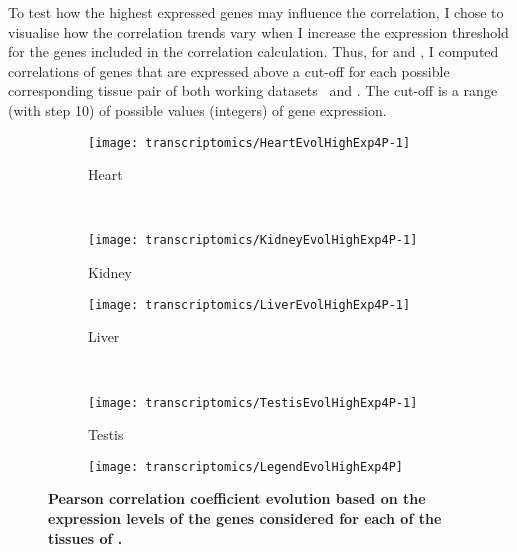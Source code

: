 To test how the highest expressed genes may influence the correlation,
I chose to visualise how the correlation trends vary
when I increase the expression threshold for the genes included
in the correlation calculation.
Thus, for  and ,
I computed correlations of genes that are expressed above a cut-off
for each possible corresponding tissue pair of both working datasets \setOne\ and \setTwo.
The cut-off is a range (with step 10) of possible values (integers) of gene expression.

\begin{sidewaysfigure}[!htpb]
    \centering
    \begin{subfigure}[b]{0.48\textwidth}\centering
        \texttt{[image: transcriptomics/HeartEvolHighExp4P-1]}
        \caption{Heart}\label{fig:CorHighExpHeart4T}
    \end{subfigure}%
~%
    \begin{subfigure}[b]{0.48\textwidth}\centering
        \texttt{[image: transcriptomics/KidneyEvolHighExp4P-1]}
        \caption{Kidney}\label{fig:CorHighExpKidney4T}
    \end{subfigure}

    \begin{subfigure}[b]{0.48\textwidth}\centering
        \texttt{[image: transcriptomics/LiverEvolHighExp4P-1]}
        \caption{Liver}\label{fig:CorHighExpLiver4T}
    \end{subfigure}%
~%
    \begin{subfigure}[b]{0.48\textwidth}\centering
        \texttt{[image: transcriptomics/TestisEvolHighExp4P-1]}
        \caption{Testis}\label{fig:CorHighExpTestis4T}
    \end{subfigure}
    \begin{subfigure}[b]{\textwidth}\centering
        \texttt{[image: transcriptomics/LegendEvolHighExp4P]}
    \end{subfigure}
    \caption[Pearson correlation coefficient trends based on the expression
    levels of the genes considered for \setOne]{%
\label{fig:CorHighExp4T}\textbf{Pearson correlation coefficient evolution
    based on the expression levels of the genes considered for each of the tissues
    of \setOne.}}
\end{sidewaysfigure}

